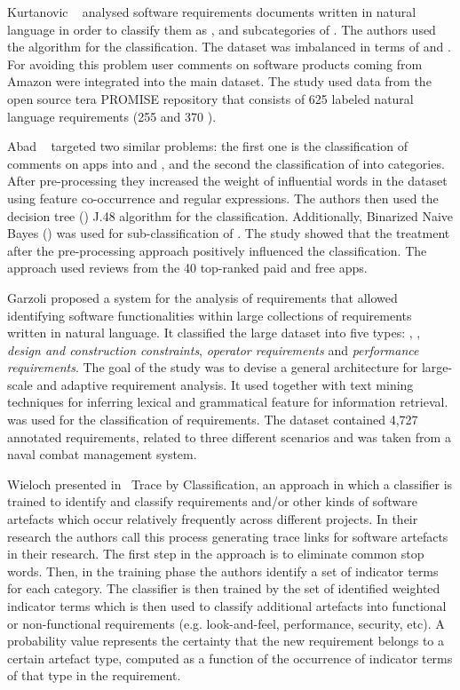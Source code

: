 Kurtanovic \etal~\cite {Kurtanovic:2017} analysed software requirements
documents written in natural language in order to classify them as \FRs, \NFRs
and subcategories of \NFRs. The authors used the \SVM algorithm for the
classification. The dataset was imbalanced in terms of \FRs and
\NFRs. For avoiding this problem user comments on software products coming
from Amazon were integrated into the main dataset. The study used data from
the open source tera PROMISE repository that consists of 625 labeled natural
language requirements (255 \FR [40.8\%] and 370 \NFR[59.2\%]).

Abad \etal~\cite{Abad:2017} targeted two similar problems: the first one is the
classification of comments on apps into \FRs and \NFRs, and the second the
classification of \NFRs into categories.
After pre-processing they increased the weight of influential words in the
dataset using feature co-occurrence and regular expressions. The authors then
used the decision tree (\DT) J.48 algorithm for the classification. Additionally,
Binarized Naive Bayes (\BNB) was used for sub-classification of \NFRs. The study
showed that the treatment after the pre-processing approach positively
influenced the classification. The approach used reviews from the 40 top-ranked
paid and free apps.

Garzoli \cite {Garzoli:2013} proposed a system for the analysis of requirements
that allowed identifying software functionalities within large collections of
requirements written in natural language. It classified the large dataset into
five types: \FRs, \NFRs, \emph{design and construction constraints},
\emph{operator requirements} and \emph{performance requirements}.  The goal of
the study was to devise a general architecture for large-scale and
adaptive requirement analysis. It used \BOW together with text mining techniques
for inferring lexical and grammatical feature for information retrieval. \SVM
was used for the classification of requirements. The dataset contained 4,727
annotated requirements, related to three different scenarios and was taken
from a naval combat management system.

Wieloch \etal presented in~\cite{Wieloch:2013} Trace by Classification, an \ML
approach in which a classifier is trained to identify and classify requirements
and/or other kinds of software artefacts which occur relatively frequently
across different projects. In their research the authors call this process
generating trace links for software artefacts in their research.
The first step in the approach is to eliminate common stop words. Then, in the
training phase the authors identify a set of indicator terms for each \NFR
category. The classifier is then trained by the set of identified weighted
indicator terms which is then used to classify additional artefacts into
functional or non-functional requirements (e.g. look-and-feel, performance,
security, etc). A probability value represents the certainty that the new
requirement belongs to a certain artefact type, computed as a function of the
occurrence of indicator terms of that type in the requirement.

